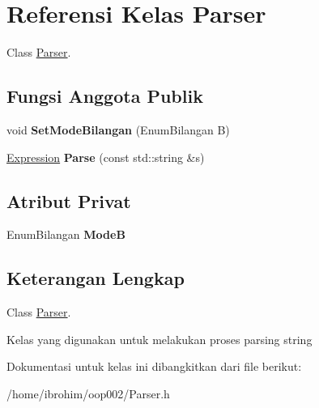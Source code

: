\hypertarget{classParser}{}\section{Referensi Kelas Parser}
\label{classParser}


Class \hyperlink{classParser}{Parser}.  


\subsection*{Fungsi Anggota Publik}
\begin{DoxyCompactItemize}
\item 
\hypertarget{classParser_a44fc8feda2b68b7bfcba5a3d1a60df8c}{}void {\bfseries Set\+Mode\+Bilangan} (Enum\+Bilangan B)\label{classParser_a44fc8feda2b68b7bfcba5a3d1a60df8c}

\item 
\hypertarget{classParser_a9241f5ed7a2c1959ed0bbb6f333d30eb}{}\hyperlink{classExpression}{Expression} {\bfseries Parse} (const std\+::string \&s)\label{classParser_a9241f5ed7a2c1959ed0bbb6f333d30eb}

\end{DoxyCompactItemize}
\subsection*{Atribut Privat}
\begin{DoxyCompactItemize}
\item 
\hypertarget{classParser_a171d8521ead0a5726fe262e410f6d970}{}Enum\+Bilangan {\bfseries Mode\+B}\label{classParser_a171d8521ead0a5726fe262e410f6d970}

\end{DoxyCompactItemize}


\subsection{Keterangan Lengkap}
Class \hyperlink{classParser}{Parser}. 

Kelas yang digunakan untuk melakukan proses parsing string 

Dokumentasi untuk kelas ini dibangkitkan dari file berikut\+:\begin{DoxyCompactItemize}
\item 
/home/ibrohim/oop002/Parser.\+h\end{DoxyCompactItemize}
